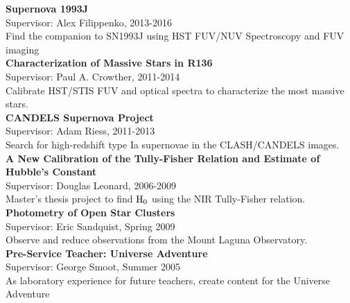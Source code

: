 \documentclass[10pt]{cv}
\begin{document}
\begin{llist}
{\bf  Supernova 1993J}\hspace{180pt} \\
\hspace*{24pt}Supervisor: Alex Filippenko, 2013-2016 \\
\hspace*{24pt}Find the companion to SN1993J using HST FUV/NUV Spectroscopy and FUV imaging \\
{\bf  Characterization of Massive Stars in R136 } \hspace{45pt} \\
\hspace*{24pt}Supervisor: Paul A. Crowther, 2011-2014\\
\hspace*{24pt}Calibrate HST/STIS FUV and optical spectra to characterize the most massive stars. \\
{\bf CANDELS Supernova Project}\hspace{116pt}\\
\hspace*{24pt}Supervisor: Adam Riess, 2011-2013 \\
\hspace*{24pt}Search for high-redshift type Ia supernovae in the CLASH/CANDELS images.\\
{\bf  A New Calibration of the Tully-Fisher Relation and Estimate of Hubble's Constant} \\ %
\hspace*{24pt}Supervisor: Douglas Leonard, 2006-2009\\
\hspace*{24pt}Master's thesis project to find $\rm{H_0}$ using the NIR Tully-Fisher relation.   \\
{\bf Photometry of Open Star Clusters } \hspace{87pt}\\
\hspace*{24pt}Supervisor: Eric Sandquist, Spring 2009\\
\hspace*{24pt}Observe and reduce observations from the Mount Laguna Observatory. \\ 
{\bf Pre-Service Teacher: Universe Adventure} \hspace{56pt}\\
\hspace*{24pt}Supervisor: George Smoot, Summer 2005 \\
\hspace*{24pt}As laboratory experience for future teachers, create content for the Universe Adventure \\

\end{llist}
\end{document}
